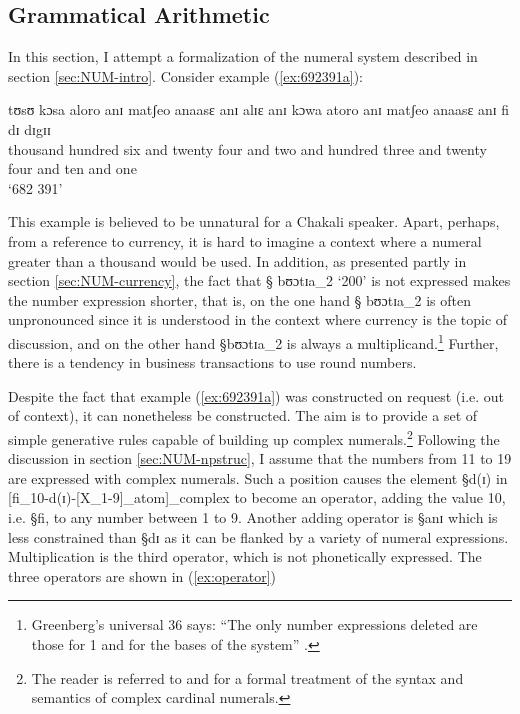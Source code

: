 \subsection{Grammatical Arithmetic}
\label{sec:NUM-gramarith}


 In this section,  I attempt a formalization of the numeral system
described in
section \ref{sec:NUM-intro}. Consider example
(\ref{ex:692391a}):

\begin{exe}
\ex\label{ex:692391a}

 \gll tʊsʊ kɔsa aloro anɪ matʃeo anaasɛ anɪ alɪɛ anɪ kɔwa atoro anɪ matʃeo
anaasɛ anɪ fi dɪ dɪgɪɪ \\
{thousand} {hundred} {six} {and} {twenty} {four} {and} {two} {and} {hundred}
{three} {and} {twenty} {four} {and} {ten}  {and} {one}\\
\glt `682 391'
\end{exe}

This example is believed to be unnatural for a Chakali speaker. Apart,
perhaps, from  a
reference to currency, it is hard to imagine a context where a numeral greater
than a thousand would be used. In addition, as
presented partly in section \ref{sec:NUM-currency}, the fact that  {\S
bʊɔtɪa}_{2}  `200'  is not  expressed makes the number
expression shorter,   that is, on the one hand {\S
bʊɔtɪa}_{2} is often unpronounced since  it is understood in the context
where
currency is the topic of discussion,  and on the other hand {\S bʊɔtɪa}_{2} is
always a multiplicand.\footnote{Greenberg's universal 36 says: ``The only number
expressions deleted are those for 1 and for the bases of the
system'' \citep[278]{Gree78b}.}  Further,  there is a  tendency in business
transactions
to
use round numbers.  

Despite the fact that example (\ref{ex:692391a}) was constructed on request
(i.e.
out of context),  it can nonetheless be constructed. The aim  is
to
provide a set of simple generative rules capable of building up complex
numerals.\footnote{The reader is referred to \cite{Smit99} and  \cite{Ioni06}
for a formal treatment
of the syntax and semantics of complex cardinal numerals.}
Following the
discussion in section \ref{sec:NUM-npstruc},  I assume that the numbers from
11 to 19 are expressed with complex numerals. Such a position causes the element
{\S d(ɪ)} in
[fi_{10}-d(ɪ)-[X_{1-9}]_{atom}]_{complex} to become an operator, adding the
value 10, i.e. {\S fi},    to  any number between 1 to 9. Another adding
operator is {\S anɪ} which is less constrained than {\S dɪ} as it can be flanked
by a variety of numeral expressions. Multiplication is the third
operator, which  is not phonetically expressed. The three operators are shown
in (\ref{ex:operator})

